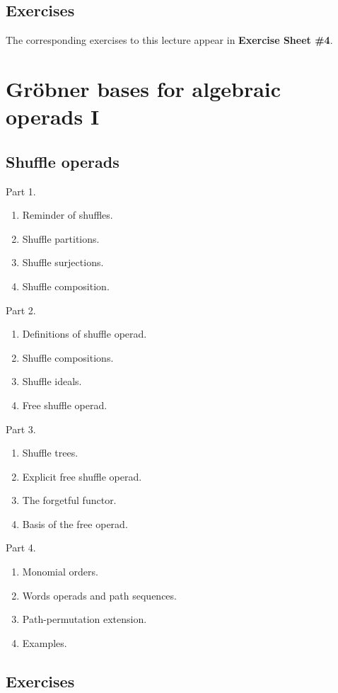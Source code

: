 \documentclass[fleqn,a4paper, twoside]{article}
\newcommand{\0}{\langle 0\rangle}
\DeclareRobustCommand{\[}{\begin{equation}}%
\DeclareRobustCommand{\]}{\end{equation}}%
\theoremstyle{mytheorem}
\theoremstyle{introthm}
\theoremstyle{mydefinition}
\theoremstyle{mydefinition2}
\theoremstyle{plain} %
\newcommand{\?}{\,?\,}
\theoremstyle{mytheorem}
\theoremstyle{plain} %
\begin{document}
\subsection{Exercises}
The corresponding exercises to this lecture appear in \textbf{Exercise Sheet \#4}.


\pagebreak

\section{Gr\"obner bases for algebraic operads I}

\subsection{Shuffle operads}

Part 1. \begin{enumerate}
\item Reminder of shuffles.
\item Shuffle partitions. 
\item Shuffle surjections.
\item Shuffle composition.
\end{enumerate}


Part 2.
\begin{enumerate}
\item Definitions of shuffle operad. 
\item Shuffle compositions.
\item Shuffle ideals.
\item Free shuffle operad.
\end{enumerate}

Part 3.
\begin{enumerate}
\item Shuffle trees. 
\item Explicit free shuffle operad.
\item The forgetful functor.
\item Basis of the free operad.
\end{enumerate}

Part 4.
\begin{enumerate}
\item Monomial orders. 
\item Words operads and path sequences.
\item Path-permutation extension.
\item Examples. 
\end{enumerate}
\subsection{Exercises}
\end{document}
